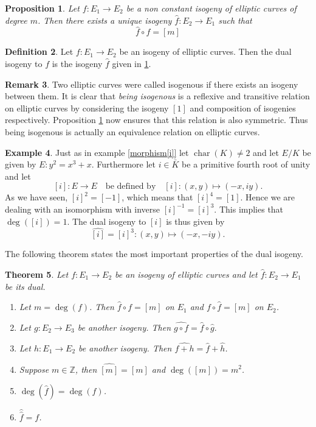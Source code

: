 \documentclass{article}
\numberwithin{equation}{section}
\newtheorem{theorem}{Theorem}[subsection]
\newtheorem{proposition}[theorem]{Proposition}
\theoremstyle{definition}
\newtheorem{definition}[theorem]{Definition}
\newtheorem{example}[theorem]{Example}
\newtheorem{remark}[theorem]{Remark}
\newcommand{\ZZ}{{\mathbb Z}} %
\newcommand{\Char}[1]{\operatorname{char} (#1)} %
\newcommand{\degree}[1]{\operatorname{deg} \left(#1\right)} %
\begin{document}
\begin{proposition}\label{dualisoproperty}
Let $f: E_1 \rightarrow E_2$ be a non constant isogeny of elliptic curves of degree $m$.  Then there exists a unique isogeny $\hat{f}: E_2 \rightarrow E_1$ such that $$\hat{f} \circ f = [m]$$
\end{proposition}

\begin{definition}\label{dualisogeny}
Let $f: E_1 \rightarrow E_2$ be an isogeny of elliptic curves. Then the dual isogeny to $f$ is the isogeny $\hat{f}$ given in \ref{dualisoproperty}.
\end{definition}

\begin{remark}\label{isoequivalence}
Two elliptic curves were called isogenous if there exists an isogeny between them. It is clear that \emph{being isogenous} is a reflexive and transitive relation on elliptic curves by considering the isogeny $[1]$ and composition of isogenies respectively. Proposition \ref{dualisoproperty} now ensures that this relation is also symmetric. Thus being isogenous is actually an equivalence relation on elliptic curves.
\end{remark}


\begin{example}
Just as in example \ref{morphism[i]} let $\Char{K}\neq 2$ and let $E/K$ be given by $E:y^2=x^3+x$. Furthermore let $i\in\bar{K}$ be a primitive fourth root of unity and let $$[i]:E \rightarrow E \quad \text{be defined by} \quad [i]: (x,y) \mapsto (-x,iy).$$ As we have seen, $[i]^2=[-1]$, which means that $[i]^4=[1]$. Hence we are dealing with an isomorphism with inverse $[i]^{-1}=[i]^3$. This implies that $\degree{[i]}=1$. The dual isogeny to $[i]$ is thus given by $$\widehat{[i]}=[i]^3:(x,y) \mapsto (-x,-iy).$$ 
\end{example}

The following theorem states the most important properties of the dual isogeny. 

\begin{theorem}\label{dualisoproperties}
Let $f: E_1 \rightarrow E_2$ be an isogeny of elliptic curves and let $\hat{f}:E_2 \rightarrow E_1$ be its dual.
\begin{enumerate}
\item Let $m=\degree{f}$. Then $\hat{f} \circ f =[m]$ on $E_1$ and $f \circ \hat{f} = [m]$ on $E_2$.
\item Let $g: E_2 \rightarrow E_3$ be another isogeny. Then $\widehat{g \circ f}=\hat{f} \circ \hat{g}.$
\item Let $h: E_1 \rightarrow E_2$ be another isogeny. Then $\widehat{f+h} = \hat{f} + \hat{h}$.
\item Suppose $m\in \ZZ$, then $\widehat{[m]}=[m]$ and $\degree{[m]}=m^2$.
\item $\deg (\hat{f})=\degree{f}$.
\item $\hat{\hat{f}}=f$.
\end{enumerate}
\end{theorem}
\end{document}

